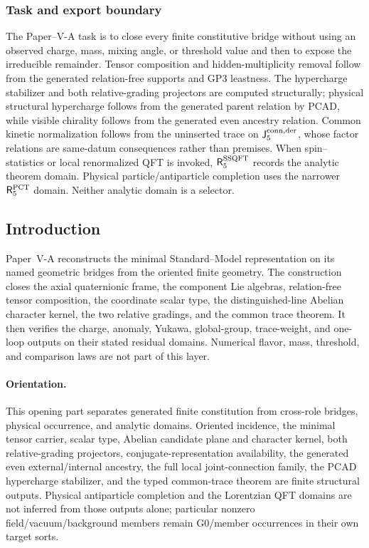 \documentclass[12pt,a4paper]{article}
\begin{document}
\subsubsection{Task and export boundary}
The Paper--V-A task is to close every finite constitutive bridge without using an
observed charge, mass, mixing angle, or threshold value and then to expose the
irreducible remainder.  Tensor composition and hidden-multiplicity removal
follow from the generated relation-free supports and GP3 leastness.  The
hypercharge stabilizer and both relative-grading projectors are computed
structurally; physical structural hypercharge follows from the generated
parent relation by PCAD, while visible chirality follows from the generated
even ancestry relation.  Common kinetic normalization follows from the
uninserted trace on \(\mathsf J_5^{\rm conn,der}\), whose factor relations are
same-datum consequences rather than premises.  When spin--statistics or local
renormalized QFT is invoked, \(\mathsf R_5^{\rm SSQFT}\) records the analytic
theorem domain.  Physical particle/antiparticle completion uses the narrower
\(\mathsf R_5^{\rm PCT}\) domain.  Neither analytic domain is a selector.

\subsection{Introduction}
\label{p5:sec:introduction}

Paper~V-A reconstructs the minimal Standard--Model representation on its named
geometric bridges from the
oriented finite geometry.  The construction closes the axial quaternionic
frame, the component Lie algebras, relation-free tensor composition, the
coordinate scalar type, the distinguished-line Abelian character kernel, the
two relative gradings, and the common trace theorem.  It then verifies the charge, anomaly, Yukawa,
global-group, trace-weight, and one-loop outputs on their stated residual
domains.
Numerical flavor, mass, threshold, and comparison laws are not part of this
layer.

\label{p5:part:closed-sm}

\paragraph{Orientation.}
This opening part separates generated finite constitution from cross-role
bridges, physical occurrence, and analytic domains.  Oriented incidence, the
minimal tensor carrier, scalar type, Abelian candidate plane and character
kernel, both relative-grading projectors, conjugate-representation
availability, the generated even external/internal ancestry, the full local
joint-connection family, the PCAD hypercharge stabilizer, and the typed
common-trace theorem are finite structural outputs.  Physical antiparticle
completion and the Lorentzian QFT domains are not inferred from those outputs
alone; particular nonzero field/vacuum/background members remain G0/member
occurrences in their own target sorts.
\end{document}
